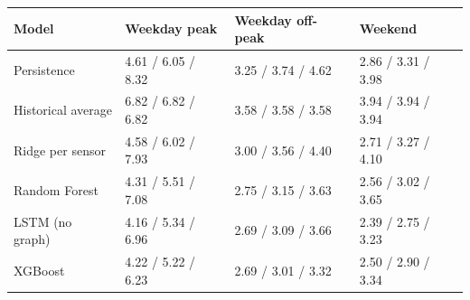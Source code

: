 \begin{tabular}{@{}llll@{}}
\toprule
Model & Weekday peak & Weekday off-peak & Weekend \\
\midrule
Persistence & 4.61 / 6.05 / 8.32 & 3.25 / 3.74 / 4.62 & 2.86 / 3.31 / 3.98 \\
Historical average & 6.82 / 6.82 / 6.82 & 3.58 / 3.58 / 3.58 & 3.94 / 3.94 / 3.94 \\
Ridge per sensor & 4.58 / 6.02 / 7.93 & 3.00 / 3.56 / 4.40 & 2.71 / 3.27 / 4.10 \\
Random Forest & 4.31 / 5.51 / 7.08 & 2.75 / 3.15 / 3.63 & 2.56 / 3.02 / 3.65 \\
LSTM (no graph) & 4.16 / 5.34 / 6.96 & 2.69 / 3.09 / 3.66 & 2.39 / 2.75 / 3.23 \\
XGBoost & 4.22 / 5.22 / 6.23 & 2.69 / 3.01 / 3.32 & 2.50 / 2.90 / 3.34 \\
\bottomrule
\end{tabular}
